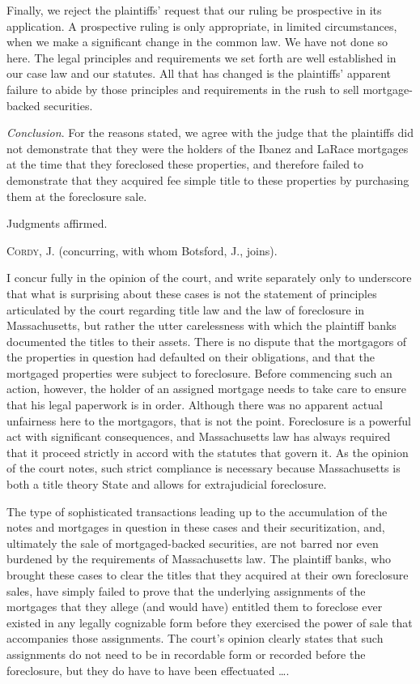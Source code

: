 Finally, we reject the plaintiffs' request that our ruling be prospective in its
application. A prospective ruling is only appropriate, in limited
circumstances, when we make a significant change in the common law. We have not
done so here. The legal principles and requirements we set forth are well
established in our case law and our statutes. All that has changed is the
plaintiffs' apparent failure to abide by those principles and requirements in
the rush to sell mortgage-backed securities.

\textit{Conclusion}. For the reasons stated, we agree with the judge that the
plaintiffs did not demonstrate that they were the holders of the Ibanez and
LaRace mortgages at the time that they foreclosed these properties, and
therefore failed to demonstrate that they acquired fee simple title to these
properties by purchasing them at the foreclosure sale.

Judgments affirmed.

\opinion \textsc{Cordy}, J. (concurring, with whom Botsford, J., joins).

I concur fully in the opinion of the court, and write separately only to
underscore that what is surprising about these cases is not the statement of
principles articulated by the court regarding title law and the law of
foreclosure in Massachusetts, but rather the utter carelessness with which the
plaintiff banks documented the titles to their assets. There is no dispute that
the mortgagors of the properties in question had defaulted on their
obligations, and that the mortgaged properties were subject to foreclosure.
Before commencing such an action, however, the holder of an assigned mortgage
needs to take care to ensure that his legal paperwork is in order. Although
there was no apparent actual unfairness here to the mortgagors, that is not the
point. Foreclosure is a powerful act with significant consequences, and
Massachusetts law has always required that it proceed strictly in accord with
the statutes that govern it. As the opinion of the court notes, such strict
compliance is necessary because Massachusetts is both a title theory State and
allows for extrajudicial foreclosure.

The type of sophisticated transactions leading up to the accumulation of the
notes and mortgages in question in these cases and their securitization, and,
ultimately the sale of mortgaged-backed securities, are not barred nor even
burdened by the requirements of Massachusetts law. The plaintiff banks, who
brought these cases to clear the titles that they acquired at their own
foreclosure sales, have simply failed to prove that the underlying assignments
of the mortgages that they allege (and would have) entitled them to foreclose
ever existed in any legally cognizable form before they exercised the power of
sale that accompanies those assignments. The court's opinion clearly states
that such assignments do not need to be in recordable form or recorded before
the foreclosure, but they do have to have been effectuated \dots.

